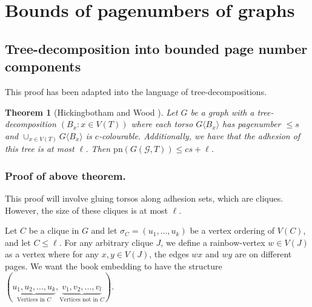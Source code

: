 \documentclass[]{report}
\newcommand{\pn}{\text{pn}}
\newtheorem{theorem}{Theorem}
\theoremstyle{definition}
\numberwithin{theorem}{section}
\numberwithin{equation}{section}
\begin{document}
\section{Bounds of pagenumbers of graphs}\label{sec:BoundedPagenumber} 
\subsection{Tree-decomposition into bounded page number components}\label{ssec:Clique_sum_Pagenumber_bound}

This proof has been adapted into the language of tree-decompositions. 
\begin{theorem}[Hickingbotham and Wood \cite{hickingbothamStackNumberCliqueSum2023}]\label{thm:clique_sum_pagenumber_bound}
	Let $G$ be a graph with a tree-decomposition $(B_x: x \in V(T))$ where each torso $G \langle B_x \rangle$ has pagenumber $\leq s$ and $\cup_{x \in V(T)} G \langle B_x \rangle$ is $c$-colourable. Additionally, we have that the adhesion of this tree is at most $\ell$.
	 Then $\pn(G(\mathcal{G}, T)) \leq cs + \ell$.  
\end{theorem}

\subsubsection{Proof of above theorem.}
This proof will involve gluing torsos along adhesion sets, which are cliques. However, the size of these cliques is at most $\ell$. 

Let $C$ be a clique in $G$ and let $\sigma_C = (u_1, ... , u_k)$ be a vertex ordering of $V(C)$, and let $C \leq \ell$. For any arbitrary clique $J$, we define a rainbow-vertex $w \in V(J)$ as a vertex where for any $x, y \in V(J)$, the edges $wx$ and $wy$ are on different pages. We want the book embedding to have the structure $(\underbrace{u_1, u_2, ..., u_k}_{\text{Vertices in } C}, \underbrace{v_1, v_2, ..., v_l}_{\text{Vertices not in }C})$. 
\end{document}
